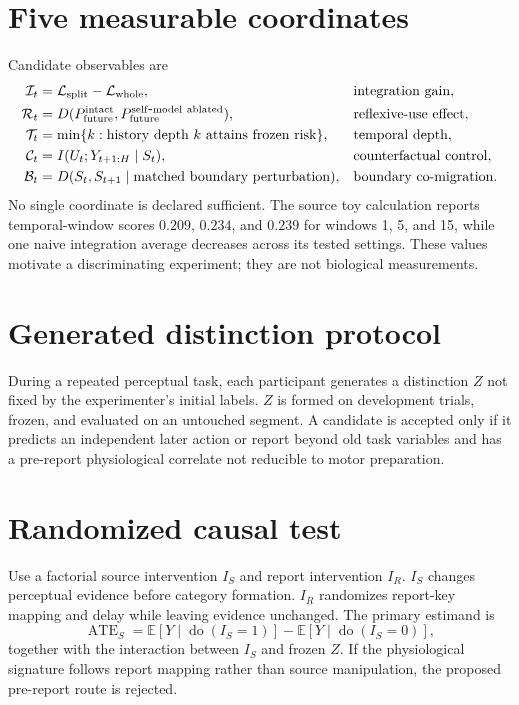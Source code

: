 \documentclass[11pt,a4paper]{article}
\begin{document}
\section{Five measurable coordinates}
Candidate observables are
\begin{align}
\mathcal I_t&=\mathcal L_{\rm split}-\mathcal L_{\rm whole},&&\text{integration gain},\\
\mathcal R_t&=D(P_{\rm future}^{\rm intact},P_{\rm future}^{\rm self\mbox{-}model\ ablated}),&&\text{reflexive-use effect},\\
\mathcal T_t&=\min\{k:\text{history depth }k\text{ attains frozen risk}\},&&\text{temporal depth},\\
\mathcal C_t&=I(U_t;Y_{t+1:H}\mid S_t),&&\text{counterfactual control},\\
\mathcal B_t&=D(S_t,S_{t+1}\mid\text{matched boundary perturbation}),&&\text{boundary co-migration}.
\end{align}
No single coordinate is declared sufficient. The source toy calculation reports temporal-window scores $0.209$, $0.234$, and $0.239$ for windows 1, 5, and 15, while one naive integration average decreases across its tested settings. These values motivate a discriminating experiment; they are not biological measurements.

\section{Generated distinction protocol}
During a repeated perceptual task, each participant generates a distinction $Z$ not fixed by the experimenter's initial labels. $Z$ is formed on development trials, frozen, and evaluated on an untouched segment. A candidate is accepted only if it predicts an independent later action or report beyond old task variables and has a pre-report physiological correlate not reducible to motor preparation.

\section{Randomized causal test}
Use a factorial source intervention $I_S$ and report intervention $I_R$. $I_S$ changes perceptual evidence before category formation. $I_R$ randomizes report-key mapping and delay while leaving evidence unchanged. The primary estimand is
\begin{equation}
\operatorname{ATE}_S=
\mathbb E[Y\mid\operatorname{do}(I_S=1)]-
\mathbb E[Y\mid\operatorname{do}(I_S=0)],
\end{equation}
together with the interaction between $I_S$ and frozen $Z$. If the physiological signature follows report mapping rather than source manipulation, the proposed pre-report route is rejected.
\end{document}
